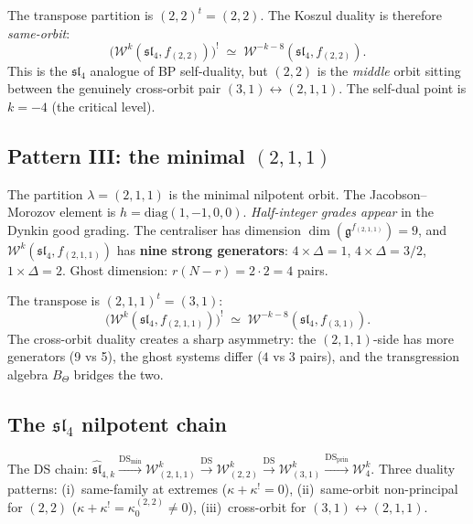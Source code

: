 \documentclass[11pt]{article}
\newcommand{\cW}{\mathcal{W}}
\newcommand{\fg}{\mathfrak{g}}
\newcommand{\fsl}{\mathfrak{sl}}
\begin{document}
\begin{observation}
\label{obs:sl4-22-koszul-wn}
The transpose partition is $(2,2)^t = (2,2)$.
The Koszul duality is therefore \emph{same-orbit}:
\[
\bigl(\cW^k(\fsl_4, f_{(2,2)})\bigr)^!
\;\simeq\;
\cW^{-k-8}(\fsl_4, f_{(2,2)}).
\]
This is the $\fsl_4$ analogue of BP self-duality,
but $(2,2)$ is the \emph{middle} orbit sitting
between the genuinely cross-orbit pair $(3,1) \leftrightarrow (2,1,1)$.
The self-dual point is $k = -4$ (the critical level).
\end{observation}

\subsection{Pattern III: the minimal $(2,1,1)$}
\label{subsec:sl4-hook-211-wn}

\begin{observation}
\label{obs:sl4-211-data-wn}
The partition $\lambda = (2,1,1)$ is the minimal nilpotent orbit.
The Jacobson--Morozov element is
$h = \mathrm{diag}(1,-1,0,0)$.  \emph{Half-integer grades appear}
in the Dynkin good grading.
The centraliser has dimension $\dim(\fg^{f_{(2,1,1)}}) = 9$,
and $\cW^k(\fsl_4, f_{(2,1,1)})$ has
\textbf{nine strong generators}: $4 \times \Delta{=}1$,
$4 \times \Delta{=}3/2$, $1 \times \Delta{=}2$.
Ghost dimension: $r(N{-}r) = 2 \cdot 2 = 4$ pairs.
\end{observation}

\begin{observation}
\label{obs:sl4-211-koszul-wn}
The transpose is $(2,1,1)^t = (3,1)$:
\[
\bigl(\cW^k(\fsl_4, f_{(2,1,1)})\bigr)^!
\;\simeq\;
\cW^{-k-8}(\fsl_4, f_{(3,1)}).
\]
The cross-orbit duality creates a sharp asymmetry:
the $(2,1,1)$-side has more generators (9 vs 5),
the ghost systems differ ($4$ vs $3$ pairs),
and the transgression algebra $B_\Theta$ bridges the two.
\end{observation}

\subsection{The $\fsl_4$ nilpotent chain}
\label{subsec:sl4-chain-wn}

\begin{observation}[The $\fsl_4$ chain]
\label{obs:sl4-chain-wn}
The DS chain:
$\widehat{\fsl}_{4,k}
\xrightarrow{\mathrm{DS}_{\min}}
\cW^k_{(2,1,1)}
\xrightarrow{\mathrm{DS}}
\cW^k_{(2,2)}
\xrightarrow{\mathrm{DS}}
\cW^k_{(3,1)}
\xrightarrow{\mathrm{DS}_{\mathrm{prin}}}
\cW_4^k$.
Three duality patterns: (i)~same-family at extremes ($\kappa+\kappa^!=0$),
(ii)~same-orbit non-principal for $(2,2)$ ($\kappa+\kappa^! = \kappa_0^{(2,2)} \neq 0$),
(iii)~cross-orbit for $(3,1)\leftrightarrow(2,1,1)$.
\end{observation}
\end{document}
